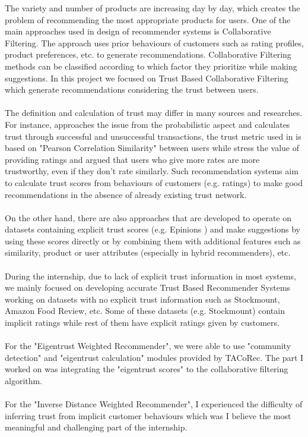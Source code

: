 The variety and number of products are increasing day by day, which creates the problem of recommending the most appropriate products for users. One of the main approaches used in design of recommender systems is Collaborative Filtering. The approach uses prior behaviours of customers such as rating profiles, product preferences, etc. to generate recommendations. Collaborative Filtering methods can be classified according to which factor they prioritize while making suggestions. In this project we focused on Trust Based Collaborative Filtering which generate recommendations considering the trust between users. \\ \\
The definition and calculation of trust may differ in many sources and researches. For instance, \cite{Eigentrust} approaches the issue from the probabilistic aspect and calculates trust through successful and unsuccessful transactions, the trust metric used in \cite{papagelis_article} is based on "Pearson Correlation Similarity" between users while \cite{lathia_article} stress the value of providing ratings and argued that users who give more rates are more trustworthy, even if they don't rate similarly. Such recommendation systems aim to calculate trust scores from behaviours of customers (e.g. ratings) to make good recommendations in the absence of already existing trust network.\\ \\
On the other hand, there are also approaches\cite{massa_article} that are developed to operate on datasets containing explicit trust scores (e.g. Epinions \cite{Epinions}) and make suggestions by using these scores directly or by combining them with additional features such as similarity, product or user attributes (especially in hybrid recommenders), etc. \\ \\
During the internship, due  to  lack  of  explicit trust  information  in  most  systems, we mainly focused on developing accurate Trust Based Recommender Systems working on datasets with no explicit trust information such as Stockmount, Amazon Food Review, etc. Some of these datasets (e.g. Stockmount) contain implicit ratings while rest of them have explicit ratings given by customers.\\ \\
For the "Eigentrust Weighted Recommender", we were able to use "community detection" and "eigentrust calculation" modules provided by TACoRec. The part I worked on was integrating the "eigentrust scores" to the collaborative filtering algorithm. \\ \\
For the "Inverse Distance Weighted Recommender", I experienced the difficulty of inferring trust from implicit customer behaviours which was I believe the most meaningful and challenging part of the internship.
